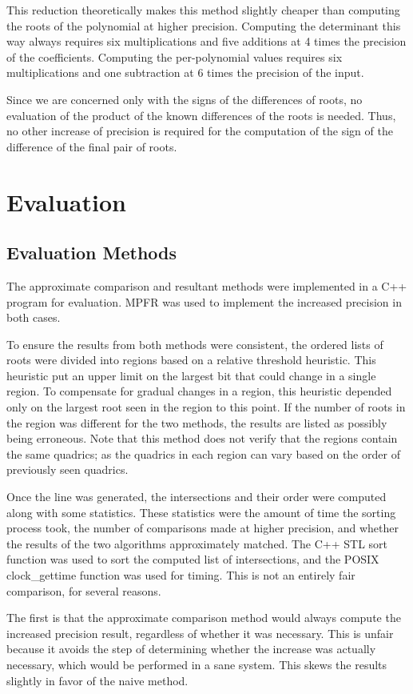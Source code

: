 \documentclass{cccg16}
\begin{document}
This reduction theoretically makes this method slightly cheaper than
computing the roots of the polynomial at higher precision.  Computing
the determinant this way always requires six multiplications and five
additions at 4 times the precision of the coefficients.  Computing the
per-polynomial values requires six multiplications and one subtraction
at 6 times the precision of the input.

Since we are concerned only with the signs of the differences of
roots, no evaluation of the product of the known differences of the
roots is needed.  Thus, no other increase of precision is required for
the computation of the sign of the difference of the final pair of
roots.

\section{Evaluation}
\subsection{Evaluation Methods}
The approximate comparison and resultant methods were implemented in a
C++ program for evaluation.  MPFR was used to implement the increased
precision in both cases.

To ensure the results from both methods were consistent, the ordered
lists of roots were divided into regions based on a relative threshold
heuristic.  This heuristic put an upper limit on the largest bit that
could change in a single region.  To compensate for gradual changes in
a region, this heuristic depended only on the largest root seen in the
region to this point.  If the number of roots in the region was
different for the two methods, the results are listed as possibly
being erroneous.  Note that this method does not verify that the
regions contain the same quadrics; as the quadrics in each region can
vary based on the order of previously seen quadrics.

Once the line was generated, the intersections and their order were
computed along with some statistics.  These statistics were the amount
of time the sorting process took, the number of comparisons made at
higher precision, and whether the results of the two algorithms
approximately matched.  The C++ STL sort function was used to sort the
computed list of intersections, and the POSIX clock\_gettime function
was used for timing.  This is not an entirely fair comparison, for
several reasons.

The first is that the approximate comparison method would always
compute the increased precision result, regardless of whether it was
necessary.  This is unfair because it avoids the step of determining
whether the increase was actually necessary, which would be performed
in a sane system.  This skews the results slightly in favor of the naive
method.
\end{document}
